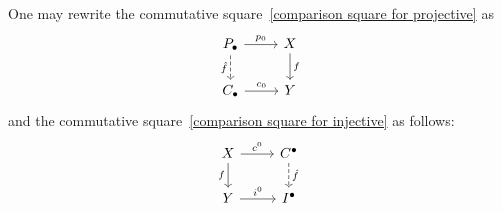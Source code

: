 \begin{remark*}
  One may rewrite the commutative square~\eqref{comparison square for projective} as
  \[
    \begin{tikzcd}
        \Pcc
        \arrow{r}[above]{p_0}
        \arrow[dashed]{d}[left]{\hat{f}}
      & X
        \arrow{d}[right]{f}
      \\
        \Ccc
        \arrow{r}[above]{c_0}
      & Y
    \end{tikzcd}
  \]
  and the commutative square~\eqref{comparison square for injective} as follows:
  \[
    \begin{tikzcd}
        X
        \arrow{r}[above]{c^0}
        \arrow{d}[left]{f}
      & \Cccc
        \arrow[dashed]{d}[right]{\hat{f}}
      \\
        Y
        \arrow{r}[above]{i^0}
      & \Iccc
    \end{tikzcd}
  \]
\end{remark*}


